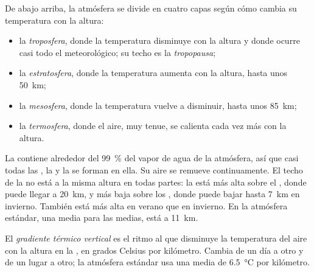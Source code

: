 \begin{definition}\label{def:g8:the-atmosphere:layers}
De abajo arriba, la atmósfera se divide en cuatro capas según cómo cambia
su temperatura con la altura:
\begin{itemize}
  \item la \emph{troposfera}, donde la temperatura
        disminuye con la altura y donde ocurre casi todo el 
        meteorológico; su techo es la \emph{tropopausa};
  \item la \emph{estratosfera}, donde la temperatura
        aumenta con la altura, hasta unos \qty{50}{km};
  \item la \emph{mesosfera}, donde la temperatura vuelve
        a disminuir, hasta unos \qty{85}{km};
  \item la \emph{termosfera}, donde el aire, muy tenue,
        se calienta cada vez más con la altura.
\end{itemize}
\end{definition}

La  contiene alrededor del 99~\% del vapor de agua de la
atmósfera, así que casi todas las , la  y la  se forman en
ella. Su aire se remueve continuamente. El techo de la  no está a
la misma altura en todas partes: la  está más alta sobre el
, donde puede llegar a \qty{20}{km}, y más baja sobre los ,
donde puede bajar hasta \qty{7}{km} en invierno. También está más alta en
verano que en invierno. En la atmósfera estándar, una media para las
 medias, está a \qty{11}{km}.

\begin{definition}\label{def:g8:the-atmosphere:lapse-rate}
El \emph{gradiente térmico vertical}
es el ritmo al que disminuye la temperatura del aire con la altura en la
, en grados Celsius por kilómetro. Cambia de un día a otro y de
un lugar a otro; la atmósfera estándar usa una media de
\qty{6.5}{\degreeCelsius} por kilómetro.
\end{definition}

